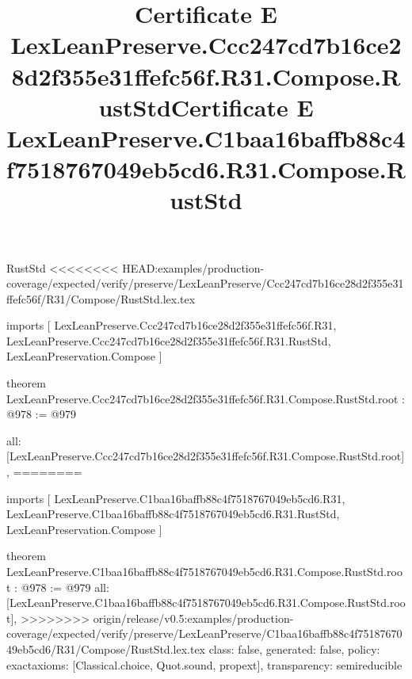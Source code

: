 \begin{lexlean}{RustStd}
<<<<<<<< HEAD:examples/production-coverage/expected/verify/preserve/LexLeanPreserve/Ccc247cd7b16ce28d2f355e31ffefc56f/R31/Compose/RustStd.lex.tex
\title{Certificate E LexLeanPreserve.Ccc247cd7b16ce28d2f355e31ffefc56f.R31.Compose.RustStd}
\begin{coremodule}
imports [
  LexLeanPreserve.Ccc247cd7b16ce28d2f355e31ffefc56f.R31,
  LexLeanPreserve.Ccc247cd7b16ce28d2f355e31ffefc56f.R31.RustStd,
  LexLeanPreservation.Compose
]

theorem LexLeanPreserve.Ccc247cd7b16ce28d2f355e31ffefc56f.R31.Compose.RustStd.root : @978 := @979 {
  all: [LexLeanPreserve.Ccc247cd7b16ce28d2f355e31ffefc56f.R31.Compose.RustStd.root],
========
\title{Certificate E LexLeanPreserve.C1baa16baffb88c4f7518767049eb5cd6.R31.Compose.RustStd}
\begin{coremodule}
imports [
  LexLeanPreserve.C1baa16baffb88c4f7518767049eb5cd6.R31,
  LexLeanPreserve.C1baa16baffb88c4f7518767049eb5cd6.R31.RustStd,
  LexLeanPreservation.Compose
]

theorem LexLeanPreserve.C1baa16baffb88c4f7518767049eb5cd6.R31.Compose.RustStd.root : @978 := @979 {
  all: [LexLeanPreserve.C1baa16baffb88c4f7518767049eb5cd6.R31.Compose.RustStd.root],
>>>>>>>> origin/release/v0.5:examples/production-coverage/expected/verify/preserve/LexLeanPreserve/C1baa16baffb88c4f7518767049eb5cd6/R31/Compose/RustStd.lex.tex
  class: false,
  generated: false,
  policy: exact{axioms: [Classical.choice, Quot.sound, propext]},
  transparency: semireducible
}


\end{coremodule}}
\end{coremodule}
\end{lexlean}
